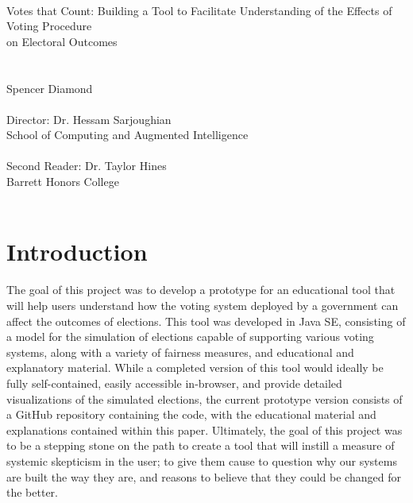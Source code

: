 \documentclass[12pt]{article}
\newcounter{step}
\begin{document}
\begin{center}
\quad \\
\quad \\
\quad \\
\quad \\
\quad \\
\quad \\
\quad \\
\quad \\
\quad \\
\quad \\
\quad \\
\LARGE Votes that Count: Building a Tool to Facilitate Understanding of the Effects of Voting Procedure\\ on Electoral Outcomes\\ \normalsize
\quad \\
\quad \\
Spencer Diamond\\
\quad \\
Director: Dr. Hessam Sarjoughian\\
School of Computing and Augmented Intelligence\\
\quad \\
Second Reader: Dr. Taylor Hines\\
Barrett Honors College\\
\quad \\
\end{center}
\newpage
\tableofcontents
\newpage

\setcounter{page}{1}
\section{Introduction} \label{Introduction}
\qquad The goal of this project was to develop a prototype for an educational tool that will help users understand how the voting system deployed by a government can affect the outcomes of elections. This tool was developed in Java SE, consisting of a model for the simulation of elections capable of supporting various voting systems, along with a variety of fairness measures, and educational and explanatory material. While a completed version of this tool would ideally be fully self-contained, easily accessible in-browser, and provide detailed visualizations of the simulated elections, the current prototype version consists of a GitHub repository containing the code, with the educational material and explanations contained within this paper. Ultimately, the goal of this project was to be a stepping stone on the path to create a tool that will instill a measure of systemic skepticism in the user; to give them cause to question why our systems are built the way they are, and reasons to believe that they could be changed for the better. \\
\end{document}
